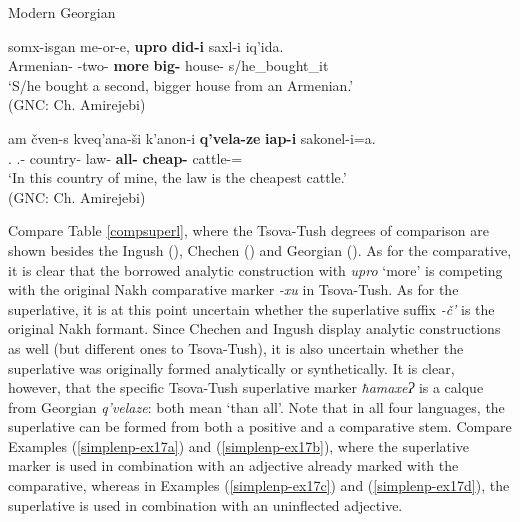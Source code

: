 \begin{exe}
	\ex\label{simplenp-ex44}
	Modern Georgian
	\begin{xlist}
		
		\ex\label{simplenp-ex44a}
		\gll somx-isgan me-or-e, \textbf{upro} \textbf{did-i} saxl-i iq'ida. \\
		Armenian-{\Abl} {\Ord}-two-{\Ord} \textbf{more} \textbf{big-{\Agr}} house-{\Nom} s/he\_bought\_it \\
		\trans `S/he bought a second, bigger house from an Armenian.' \\
		\hfill (GNC: Ch. Amirejebi)
		
		\ex\label{simplenp-ex44b}
		\gll am čven-s kveq'ana-ši k'anon-i \textbf{q'vela-ze} \textbf{iap-i} sakonel-i=a. \\
		{\Prox}.{\Obl} {\Fpl}.{\Poss}-{\Obl} country-{\In} law-{\Nom} \textbf{all-{\Super}} \textbf{cheap-{\Agr}} cattle-{\Nom}={\Cop} \\
		\trans `In this country of mine, the law is the cheapest cattle.' \\
		\hfill (GNC: Ch. Amirejebi)
		
	\end{xlist}
\end{exe}

Compare Table \ref{compsuperl}, where the Tsova-Tush degrees of comparison are shown besides the Ingush (\cite[219]{nichols11}), Chechen (\cite[30]{nichols94Che}) and Georgian (\cite[236]{vogt}). As for the comparative, it is clear that the borrowed analytic construction with \textit{upro} `more' is competing with the original Nakh comparative marker \textit{-xu} in Tsova-Tush. As for the superlative, it is at this point uncertain whether the superlative suffix \textit{-č'} is the original Nakh formant. Since Chechen and Ingush display analytic constructions as well (but different ones to Tsova-Tush), it is also uncertain whether the superlative was originally formed analytically or synthetically. It is clear, however, that the specific Tsova-Tush superlative marker \textit{ħamaxeɁ} is a calque from Georgian \textit{q'velaze}: both mean `than all'. Note that in all four languages, the superlative can be formed from  both a positive and a comparative stem. Compare Examples (\ref{simplenp-ex17a}) and (\ref{simplenp-ex17b}), where the superlative marker is used in combination with an adjective already marked with the comparative, whereas in Examples (\ref{simplenp-ex17c}) and (\ref{simplenp-ex17d}), the superlative is used in combination with an uninflected adjective.\largerpage

